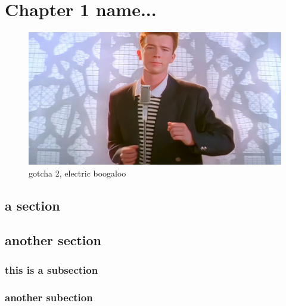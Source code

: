 \chapter{Chapter 1 name...}


\begin{figure}[ht]
	\centering
	\includegraphics[width=\textwidth]{assets/example-asset.jpg}
	\caption{gotcha 2, electric boogaloo}
	\label{fig:rick_roll}
\end{figure}

\section{a section}

\lipsum[1-2]


\section{another section}

\lipsum[3-5]

\subsection{this is a subsection}

\lipsum[7-8]

\subsection{another subection}

\lipsum[4-6]
